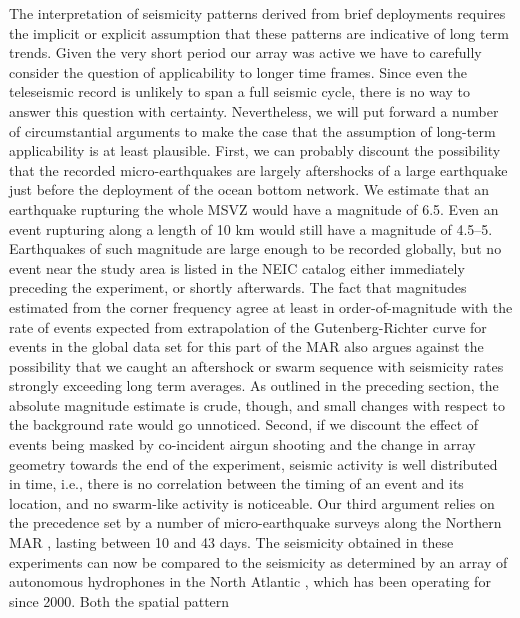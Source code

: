 \documentclass[jgr]{aguplus}
\newlength{\tw}
\begin{document}
\begin{article}
The interpretation of  seismicity patterns derived from brief deployments requires
the implicit or explicit assumption that these patterns are indicative
of long term trends.
Given the very short period our array was
active we have to carefully consider the question of applicability to longer
time frames.  Since even the teleseismic record is unlikely to
span a full seismic cycle, there is no way to answer this question with
 certainty.  Nevertheless, we will put forward a number of
circumstantial arguments to make the case that the assumption of long-term
applicability is at least plausible.   First, we can probably discount the
possibility that the recorded micro-earthquakes are largely
aftershocks of a large earthquake just before the deployment of the
ocean bottom network.  We estimate that an earthquake rupturing the whole
MSVZ would have a magnitude of
6.5.  Even an event rupturing along a length of 10 km would still have
a magnitude of 4.5--5.  Earthquakes of such magnitude are large enough
to be recorded globally, but no event near the study area is listed in
the NEIC catalog \citep{neic00}
either immediately preceding the experiment, or shortly afterwards.
The fact that magnitudes estimated from the corner frequency agree at
least in order-of-magnitude with the rate of events expected from
extrapolation of the Gutenberg-Richter curve for events in the global
data set for this part of the MAR also argues against the possibility that
we caught an aftershock or swarm sequence with
seismicity rates strongly exceeding long term averages.  As outlined
in the preceding section, the
absolute magnitude estimate is crude, though,  and  small changes with respect to the
background rate would go unnoticed.
Second, if we discount the effect of events being masked by
co-incident airgun shooting and the change in array geometry towards
the end of the experiment, seismic activity is well distributed in
time, i.e., there is no correlation between the timing of an event and
its location, and no swarm-like activity is noticeable.
Our third argument relies on the precedence set by a number of
micro-earthquake surveys along the Northern MAR
\citep{toomey88,kong92,wolfe95,barclay01}, lasting between 10 and 43
days. The seismicity obtained in these experiments can now be compared
to the seismicity as determined by an array of autonomous hydrophones
in the North Atlantic \citep{smith03}, which has been operating for
since 2000. Both the spatial pattern

\end{article}
\end{document}

